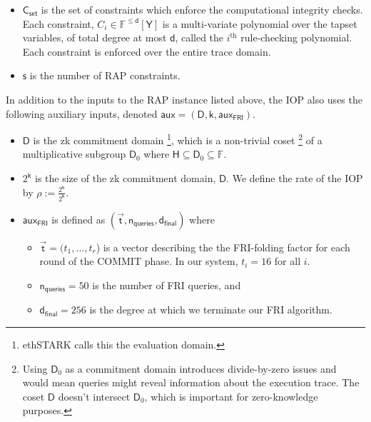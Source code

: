 \documentclass[10pt,letterpaper,titlepage]{article}
\theoremstyle{definition}
\begin{document}
\begin{itemize}
  \footnote{A tap is a reference to an entry in the trace; the constraints are expressed as a function of various taps. For more details on taps, see Appendix \ref{taps}. Note that ethSTARK uses the term \textit{mask} where we use \textit{tapset}.}. 
  \item $\mathsf{C}_\mathsf{set}$ is the set of constraints which enforce the computational integrity checks. 
  Each constraint, $C_i\in\mathbb{F}^{\leq \mathsf{d}}[\mathsf{Y}]$ is a multi-variate polynomial over the tapset variables, of total degree at most $\mathsf{d}$, called the $i^\text{th}$ rule-checking polynomial. 
  Each constraint is enforced over the entire trace domain.
  \item $\mathsf{s}$ is the number of RAP constraints.
\end{itemize} 
In addition to the inputs to the RAP instance listed above, the IOP also uses the following auxiliary inputs, denoted $\mathsf{aux}=(\mathsf{D},\mathsf{k},\mathsf{aux}_\mathsf{FRI})$.
\begin{itemize}
  \item $\mathsf{D}$ is the zk commitment domain%
  \footnote{ethSTARK calls this the evaluation domain.}, which is a non-trivial coset%
  \footnote{Using $\mathsf{D}_0$ as a commitment domain introduces divide-by-zero issues and would mean queries might reveal information about the execution trace. 
  The coset $\mathsf{D}$ doesn't intersect $\mathsf{D}_0$, which is important for zero-knowledge purposes.}
  of a multiplicative subgroup $\mathsf{D}_0$ where $\mathsf{H}\subseteq\mathsf{D}_0\subseteq\mathbb{F}$.
  \item $2^\mathsf{k}$ is the size of the zk commitment domain, $\mathsf{D}$. 
  We define the rate of the IOP by $\rho := \frac{2^\mathsf{h}}{2^\mathsf{k}}$. 
  \item $\mathsf{aux}_\mathsf{FRI}$ is defined as $(\vec{\mathsf{t}},\mathsf{n_{queries}}, \mathsf{d_{final}})$ where 
    \begin{itemize}
      \item $\vec{\mathsf{t}}=(t_1,...,t_r$) is a vector describing the the FRI-folding factor for each round of the COMMIT phase. In our system, $t_i=16$ for all $i$.
      \item $\mathsf{n_{queries}}=50$ is the number of FRI queries, and 
      \item $\mathsf{d_{final}}=256$ is the degree at which we terminate our FRI algorithm.
    \end{itemize}
\end{itemize}
\end{document}
